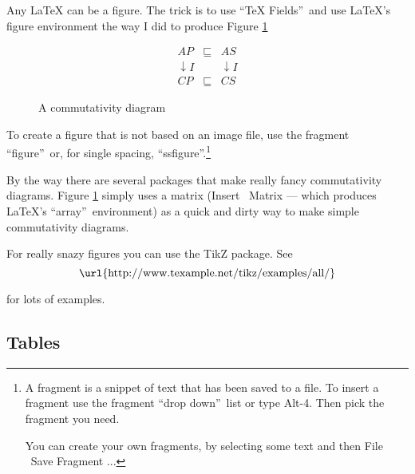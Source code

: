 Any LaTeX can be a figure. The trick is to use \textquotedblleft TeX
Fields\textquotedblright\ and use LaTeX's figure environment the way I did
to produce Figure \ref{fig-eqn-as-figure}

\begin{figure}[tb]%
\begin{equation*}
\begin{array}{lll}
AP & \sqsubseteq & AS \\ 
\downarrow I &  & \downarrow I \\ 
CP & \sqsubseteq & CS%
\end{array}%
\end{equation*}

\caption{A commutativity diagram}\label{fig-eqn-as-figure}
\end{figure}%

To create a figure that is not based on an image file, use the fragment
\textquotedblleft figure\textquotedblright\ or, for single spacing,
\textquotedblleft ssfigure\textquotedblright .\footnote{%
A fragment is a snippet of text that has been saved to a file. To insert a
fragment use the fragment \textquotedblleft drop down\textquotedblright\
list or type Alt-4. Then pick the fragment you need.
\par
You can create your own fragments, by selecting some text and then File 
\TEXTsymbol{>}\TEXTsymbol{>}\ Save Fragment ...}

By the way there are several packages that make really fancy commutativity
diagrams. Figure \ref{fig-eqn-as-figure} simply uses a matrix (Insert 
\TEXTsymbol{>}\TEXTsymbol{>}\ Matrix --- which produces LaTeX's
\textquotedblleft array\textquotedblright\ environment) as a quick and dirty
way to make simple commutativity diagrams.

For really snazy figures you can use the TikZ package. See 
\begin{equation*}
\text{\url{http://www.texample.net/tikz/examples/all/}}
\end{equation*}

\noindent for lots of examples.

\subsection{Tables}

